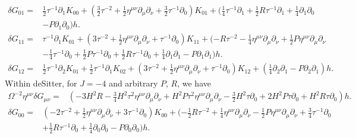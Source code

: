 \documentclass[10pt,letterpaper]{article}
\begin{document}
\begin{align}
\delta G_{01}={}&\tfrac{1}{2} \tau^{-1} \partial_{1} K_{00}
 + (\tfrac{3}{2} \tau^{-2}
 + \tfrac{1}{2} \eta^{\mu \nu} \partial_{\mu} \partial_{\nu}
 + \tfrac{3}{2} \tau^{-1} \partial_{0}) K_{01}
 + (\tfrac{1}{4} \tau^{-1} \partial_{1}
 + \tfrac{1}{2} R \tau^{-1} \partial_{1}
 + \tfrac{1}{4} \partial_{1} \partial_{0}\nonumber\\
& -  P \partial_{1} \partial_{0}) h.
\end{align}
\begin{align}
\delta G_{11}={}&\tau^{-1} \partial_{1} K_{01}
 + (3 \tau^{-2}
 + \tfrac{1}{2} \eta^{\mu \nu} \partial_{\mu} \partial_{\nu}
 + \tau^{-1} \partial_{0}) K_{11}
 + (- R \tau^{-2}
 -  \tfrac{1}{4} \eta^{\mu \nu} \partial_{\mu} \partial_{\nu}
 + \tfrac{1}{2} P \eta^{\mu \nu} \partial_{\mu} \partial_{\nu}\nonumber\\
& -  \tfrac{1}{4} \tau^{-1} \partial_{0}
 + \tfrac{1}{2} P \tau^{-1} \partial_{0}
 + \tfrac{1}{2} R \tau^{-1} \partial_{0}
 + \tfrac{1}{4} \partial_{1} \partial_{1}
 -  P \partial_{1} \partial_{1}) h.
\end{align}
\begin{align}
\delta G_{12}={}&\tfrac{1}{2} \tau^{-1} \partial_{2} K_{01}
 + \tfrac{1}{2} \tau^{-1} \partial_{1} K_{02}
 + (3 \tau^{-2}
 + \tfrac{1}{2} \eta^{\mu \nu} \partial_{\mu} \partial_{\nu}
 + \tau^{-1} \partial_{0}) K_{12}
 + (\tfrac{1}{4} \partial_{2} \partial_{1}
 -  P \partial_{2} \partial_{1}) h.
\end{align}
Within deSitter, for $J=-4$ and arbitrary $P$, $R$, we have
 \begin{align}
\Omega^{-2}\eta^{\mu\nu}\delta G_{\mu\nu}={}&(-3 H^2 R
 -  \tfrac{3}{4} H^2 \tau^2 \eta^{\mu \nu} \partial_{\mu} \partial_{\nu}
 + H^2 P \tau^2 \eta^{\mu \nu} \partial_{\mu} \partial_{\nu}
 -  \tfrac{3}{2} H^2 \tau \partial_{0}
 + 2 H^2 P \tau \partial_{0}
 + H^2 R \tau \partial_{0}) h.
\end{align}
 \begin{align}
\delta G_{00}={}&(-2 \tau^{-2}
 + \tfrac{1}{2} \eta^{\mu \nu} \partial_{\mu} \partial_{\nu}
 + 3 \tau^{-1} \partial_{0}) K_{00}
 + (- \tfrac{1}{2} R \tau^{-2}
 + \tfrac{1}{4} \eta^{\mu \nu} \partial_{\mu} \partial_{\nu}
 -  \tfrac{1}{2} P \eta^{\mu \nu} \partial_{\mu} \partial_{\nu}
 + \tfrac{3}{4} \tau^{-1} \partial_{0}\nonumber\\
& + \tfrac{1}{2} R \tau^{-1} \partial_{0}
 + \tfrac{1}{4} \partial_{0} \partial_{0}
 -  P \partial_{0} \partial_{0}) h.
\end{align}
\end{document}
